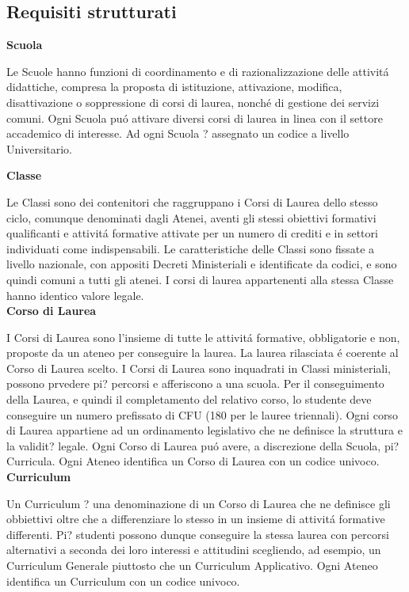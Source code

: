 \documentclass[a4paper,12pt,italian,towside]{article}
\begin{document}
\subsection{Requisiti strutturati}

\textbf{Scuola}
\par Le Scuole hanno funzioni di coordinamento e di razionalizzazione delle attivit\'a didattiche, compresa la proposta di istituzione, attivazione, modifica, disattivazione o soppressione di corsi di laurea, nonch\'e di gestione dei servizi comuni. Ogni Scuola pu\'o attivare diversi corsi di laurea in linea con il settore accademico di interesse. Ad ogni Scuola ? assegnato un codice a livello Universitario.
\newline

\textbf{Classe}
\par
Le Classi sono dei contenitori che raggruppano i Corsi di Laurea dello stesso ciclo, comunque denominati dagli Atenei, aventi gli stessi obiettivi formativi qualificanti e attivit\'a formative attivate per un numero di crediti e in settori individuati come indispensabili. Le caratteristiche delle Classi sono fissate a livello nazionale, con appositi Decreti Ministeriali e identificate da codici, e sono quindi comuni a tutti gli atenei. I corsi di laurea appartenenti alla stessa Classe hanno identico valore legale.
\\

\textbf{Corso di Laurea}
\par
I Corsi di Laurea sono l'insieme di tutte le attivit\'a formative, obbligatorie e non, proposte da un ateneo per conseguire la laurea. La laurea rilasciata \'e coerente al Corso di Laurea scelto. I Corsi di Laurea sono inquadrati in Classi ministeriali, possono prvedere pi? percorsi e afferiscono a una scuola. Per il conseguimento della Laurea, e quindi il completamento del relativo corso, lo studente deve conseguire un numero prefissato di CFU (180 per le lauree triennali). Ogni corso di Laurea appartiene ad un ordinamento legislativo che ne definisce la struttura e la validit? legale. Ogni Corso di Laurea pu\'o avere, a discrezione della Scuola, pi? Curricula. Ogni Ateneo identifica un Corso di Laurea con un codice univoco.\\


\textbf{Curriculum}
\par
Un Curriculum ? una denominazione di un Corso di Laurea che ne definisce gli obbiettivi oltre che a differenziare lo stesso in un insieme di attivit\'a formative differenti. Pi? studenti possono dunque conseguire la stessa laurea con percorsi alternativi a seconda dei loro interessi e attitudini scegliendo, ad esempio, un Curriculum Generale piuttosto che un Curriculum Applicativo.
Ogni Ateneo identifica un Curriculum con un codice univoco.\\
\end{document}
